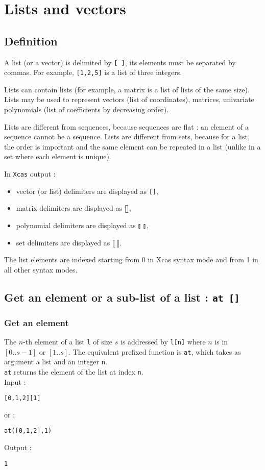 \documentclass[a4paper,11pt]{book}
\begin{document}
\section{Lists and vectors}
\subsection{Definition}
A list (or a vector) is delimited by {\tt [ ]},
its elements must be separated by commas. 
For example, {\tt [1,2,5]} is a list of three integers.

Lists can contain lists (for example, a matrix is a list of lists 
of the same size). Lists may be used to represent vectors
(list of coordinates), matrices, univariate polynomials 
(list of coefficients by decreasing order). 

Lists are different from sequences, because sequences are flat : an element 
of a sequence cannot be a sequence.
Lists are different from sets, because for a list, the order is
important and the same element can be repeated in a list (unlike in
a set where each element is unique). 

In {\tt Xcas} output :
\begin{itemize}
\item vector (or list) delimiters are displayed as {\tt []}, 
\item matrix delimiters are displayed as {\bf []},
\item polynomial delimiters are displayed as $\talloblong \ \talloblong$,
\item set delimiters are displayed as $\llbracket \ \rrbracket$.
\end{itemize}

The list elements are indexed starting from 0 in Xcas syntax mode
and from 1 in all other syntax modes.


\subsection{Get an element or a sub-list of a list : {\tt at []}}\label{sec:at}
\subsubsection{Get an element}
\noindent The $n$-th element of a list {\tt l} of size $s$
is addressed by {\tt l[n]} where $n$ is in $[0..s-1]$ or $[1..s]$.
The equivalent prefixed function is
{\tt at}, which takes as argument a list and an integer {\tt n}.\\
{\tt at} returns the element of the list at index {\tt n}.\\
Input :
\begin{center}{\tt [0,1,2][1]}\end{center}
or :
\begin{center}{\tt at([0,1,2],1)}\end{center}
Output :
\begin{center}{\tt  1}\end{center}
\end{document}
